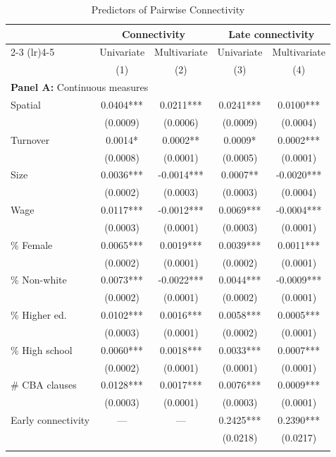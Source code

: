 \begin{table}[H]
\centering
\caption{Predictors of Pairwise Connectivity}
\label{tab:pairwise_conn_appendix}
\footnotesize
\begin{tabular}{lcccc}
\toprule\toprule
 & \multicolumn{2}{c}{Connectivity} & \multicolumn{2}{c}{Late connectivity} \\
\cmidrule(lr){2-3} \cmidrule(lr){4-5}
 & Univariate & Multivariate & Univariate & Multivariate \\
 & (1) & (2) & (3) & (4) \\
\midrule
\multicolumn{5}{l}{\textbf{Panel A:} Continuous measures} \\
Spatial & 0.0404*** & 0.0211*** & 0.0241*** & 0.0100*** \\
 & (0.0009) & (0.0006) & (0.0009) & (0.0004) \\
Turnover & 0.0014* & 0.0002** & 0.0009* & 0.0002*** \\
 & (0.0008) & (0.0001) & (0.0005) & (0.0001) \\
Size & 0.0036*** & -0.0014*** & 0.0007** & -0.0020*** \\
 & (0.0002) & (0.0003) & (0.0003) & (0.0004) \\
Wage & 0.0117*** & -0.0012*** & 0.0069*** & -0.0004*** \\
 & (0.0003) & (0.0001) & (0.0003) & (0.0001) \\
\% Female & 0.0065*** & 0.0019*** & 0.0039*** & 0.0011*** \\
 & (0.0002) & (0.0001) & (0.0002) & (0.0001) \\
\% Non-white & 0.0073*** & -0.0022*** & 0.0044*** & -0.0009*** \\
 & (0.0002) & (0.0001) & (0.0002) & (0.0001) \\
\% Higher ed. & 0.0102*** & 0.0016*** & 0.0058*** & 0.0005*** \\
 & (0.0003) & (0.0001) & (0.0002) & (0.0001) \\
\% High school & 0.0060*** & 0.0018*** & 0.0033*** & 0.0007*** \\
 & (0.0002) & (0.0001) & (0.0001) & (0.0001) \\
\# CBA clauses & 0.0128*** & 0.0017*** & 0.0076*** & 0.0009*** \\
 & (0.0003) & (0.0001) & (0.0003) & (0.0001) \\
Early connectivity & --- & --- & 0.2425*** & 0.2390*** \\
 &  &  & (0.0218) & (0.0217) \\
 &  &  &  & \\

\end{tabular}
\end{table}

